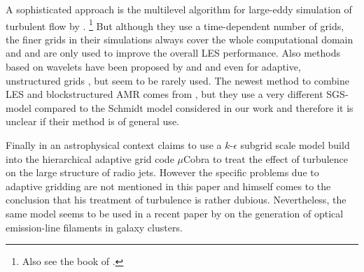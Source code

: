A sophisticated approach is the multilevel algorithm for large-eddy
simulation of turbulent flow by \citet{Terracol2001,Terracol2003}.
\footnote{Also see the book of \citet{Sagaut2006a}.} But although
they use a time-dependent number of grids, the finer grids in their simulations
always cover the whole computational domain and and are only used to improve
the overall LES performance. Also methods based on wavelets have been proposed
by \citet{Goldstein2004} and \citet{Leonard2006} and even for
adaptive, unstructured grids \citep{Mitran2001a, Naegele2003}, but
seem to be
rarely used. The newest method to combine LES and blockstructured AMR comes from
\citet{Pantano2007}, but they use a very different SGS-model compared to the
Schmidt model considered in our work and therefore it is unclear if their
method is of general use.

Finally in an astrophysical context \citet{Falle1994} claims to use a
$k$-$\epsilon$ subgrid scale model build into the hierarchical adaptive grid
code $\mu$Cobra to treat the effect of turbulence on the large structure of
radio jets. However the specific problems due to adaptive gridding are not
mentioned in this paper and \citet{Falle1994} himself comes to the conclusion
that his treatment of turbulence is rather dubious. Nevertheless, the same model
seems to be used in a recent paper by \citet{Pope2008} on the generation of
optical emission-line filaments in galaxy clusters. 

